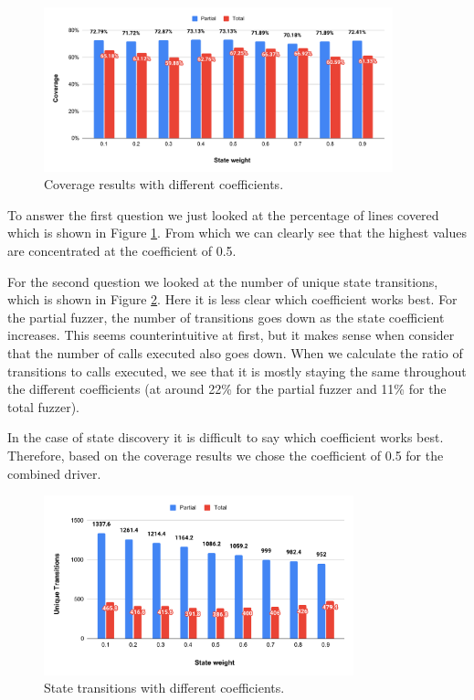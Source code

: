 \begin{figure}[!htbp]
    \centering
    \includegraphics[width=0.9\textwidth]{charts/coef-cov-2.pdf}
    \caption{Coverage results with different coefficients.}\label{fig:case-study-coeff}
\end{figure}

To answer the first question we just looked at the percentage of lines covered which is shown in Figure \ref{fig:case-study-coeff}.
From which we can clearly see that the highest values are concentrated at the coefficient of 0.5.



For the second question we looked at the number of unique state transitions, which is shown in Figure \ref{fig:coef-trans}.
Here it is less clear which coefficient works best.
For the partial fuzzer, the number of transitions goes down as the state coefficient increases.
This seems counterintuitive at first, but it makes sense when consider that the number of calls executed also goes down.
When we calculate the ratio of transitions to calls executed, we see that it is mostly staying the same throughout the different coefficients (at around 22\% for the partial fuzzer and 11\% for the total fuzzer).

\begin{mybox}
    In the case of state discovery it is difficult to say which coefficient works best.
    Therefore, based on the coverage results we chose the coefficient of 0.5 for the combined driver.
\end{mybox}


\begin{figure}[!htbp]
    \centering
    \includegraphics[width=0.8\textwidth]{charts/coef-trans-2.pdf}
    \caption{State transitions with different coefficients.}\label{fig:coef-trans}
\end{figure}

